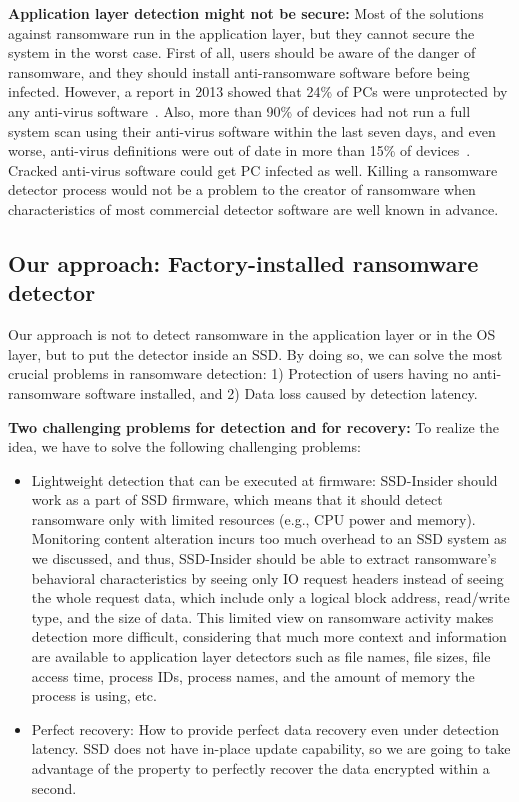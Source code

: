 \documentclass[conference]{IEEEtran}
\newcommand{\eg}{e.g.,\xspace}
\newcommand{\ours}{SSD-Insider}
\begin{document}
{\bf Application layer detection might not be secure:}
Most of the solutions against ransomware run in the application
layer, but they cannot secure the system in the worst case.  First
of all, users should be aware of the danger of ransomware, and they
should install anti-ransomware software before being infected.
However, a report in 2013 showed that 24\% of PCs were unprotected
by any anti-virus software~\cite{unprotected}.  Also, more than
90\% of devices had not run a full system scan using their
anti-virus software within the last seven days, and even worse,
anti-virus definitions were out of date in more than 15\% of
devices~\cite{antivirus}. Cracked anti-virus software could get PC
infected as well.  Killing a ransomware detector process would not
be a problem to the creator of ransomware when characteristics of
most commercial detector software are well known in advance.

\subsection{Our approach: Factory-installed ransomware detector}
Our approach is not to detect ransomware in the application layer or in
the OS layer, but to put the detector inside an SSD. By doing so,
we can solve the most crucial problems in ransomware detection: 
1) Protection of users having no anti-ransomware software installed, 
and 2) Data loss caused by detection latency.

{\bf Two challenging problems for detection and for recovery:}
To realize the idea, we have to solve the following challenging
problems: 
\begin{itemize}
    \item Lightweight detection that can be executed at firmware: 
    \ours{} should work as a part of SSD firmware, which means that it should
    detect ransomware only with limited resources (\eg CPU power and memory). 
    Monitoring content alteration incurs too much overhead to an SSD system as we discussed,
    and thus, \ours{} should be able to extract ransomware's behavioral characteristics
    by seeing only IO request headers instead of seeing the whole request data, 
    which include only a logical block address, read/write type, and the size of data. 
    This limited view on ransomware activity makes detection more difficult,
    considering that much more context and information are available to application layer detectors 
    such as file names, file sizes, file access time, process IDs, process names, and the amount of memory 
    the process is using, etc. 
    \item Perfect recovery: How to provide perfect data recovery even under detection latency. 
    SSD does not have in-place update capability, so we are going to take advantage of the property
    to perfectly recover the data encrypted within a second.
\end{itemize}
\end{document}
